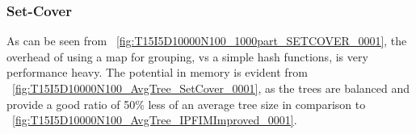 \subsubsection{Set-Cover}
As can be seen from ~\autoref{fig:T15I5D10000N100_1000part_SETCOVER_0001}, the overhead of using a map for grouping, vs a simple hash functions, is very performance heavy. The potential in memory is evident from ~\autoref{fig:T15I5D10000N100_AvgTree_SetCover_0001}, as the trees are balanced and provide a good ratio of 50\% less of an average tree size in comparison to ~\autoref{fig:T15I5D10000N100_AvgTree_IPFIMImproved_0001}.
%
%
%
%
%
%
